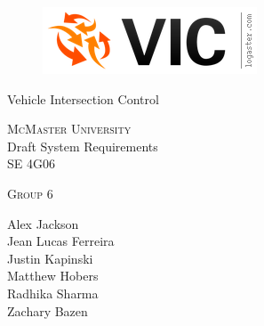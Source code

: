 \documentclass [12pt]{article}
\begin{document}
\begin {center} 

\thispagestyle{empty}
\vspace*{4.5cm}

\begin {figure}[h!]
\centering
\hspace{-10mm}\includegraphics [scale = .5, trim={.4cm 0 .8cm 0},clip] {figures/vic_logo.png}
\end {figure}

{\fontfamily{\cabinfamily}\selectfont
\Huge{Vehicle Intersection Control} }

\vspace{1 cm}
{\LARGE{\textsc{McMaster University}}\\}  \vspace {1cm}
{\Large Draft System Requirements\\ \vspace {0.5 cm} SE 4G06}  \vspace {1cm}

{\large \textsc{Group 6} \\} \vspace{1cm}

{
Alex Jackson \\
Jean Lucas Ferreira \\
Justin Kapinski\\
Matthew Hobers\\
Radhika Sharma\\
Zachary Bazen}




\end{center}


\pagebreak


\tableofcontents
\listoftables

\pagebreak

\end{document}
